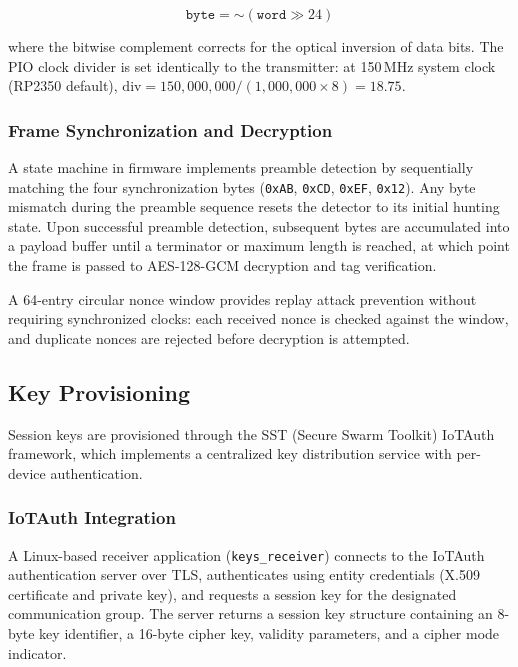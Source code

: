 \documentclass[conference]{IEEEtran}
\begin{document}
\begin{equation}
\texttt{byte} = \mathord{\sim}(\texttt{word} \gg 24)
\end{equation}

\noindent where the bitwise complement corrects for the optical inversion of data bits. The PIO clock divider is set identically to the transmitter: at 150\,MHz system clock (RP2350 default), $\text{div} = 150{,}000{,}000 / (1{,}000{,}000 \times 8) = 18.75$.

\subsubsection{Frame Synchronization and Decryption}

A state machine in firmware implements preamble detection by sequentially matching the four synchronization bytes (\texttt{0xAB}, \texttt{0xCD}, \texttt{0xEF}, \texttt{0x12}). Any byte mismatch during the preamble sequence resets the detector to its initial hunting state. Upon successful preamble detection, subsequent bytes are accumulated into a payload buffer until a terminator or maximum length is reached, at which point the frame is passed to AES-128-GCM decryption and tag verification.

A 64-entry circular nonce window provides replay attack prevention without requiring synchronized clocks: each received nonce is checked against the window, and duplicate nonces are rejected before decryption is attempted.

\subsection{Key Provisioning}
\label{sec:key-provisioning-arch}

Session keys are provisioned through the SST (Secure Swarm Toolkit) IoTAuth framework, which implements a centralized key distribution service with per-device authentication.

\subsubsection{IoTAuth Integration}

A Linux-based receiver application (\texttt{keys\_receiver}) connects to the IoTAuth authentication server over TLS, authenticates using entity credentials (X.509 certificate and private key), and requests a session key for the designated communication group. The server returns a session key structure containing an 8-byte key identifier, a 16-byte cipher key, validity parameters, and a cipher mode indicator.
\end{document}
